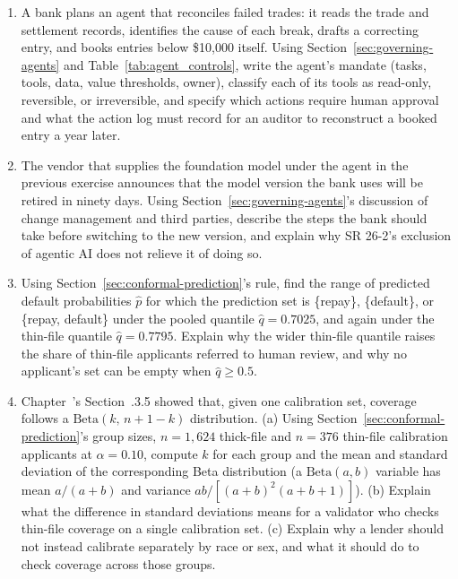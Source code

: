 \documentclass[../ai_in_finance]{subfiles}
\begin{document}
\begin{enumerate}[exercises]
    \item A bank plans an agent that reconciles failed trades: it reads the trade and settlement records, identifies the cause of each break, drafts a correcting entry, and books entries below \$10{,}000 itself. Using Section~\ref{sec:governing-agents} and Table~\ref{tab:agent_controls}, write the agent's mandate (tasks, tools, data, value thresholds, owner), classify each of its tools as read-only, reversible, or irreversible, and specify which actions require human approval and what the action log must record for an auditor to reconstruct a booked entry a year later.
    \item The vendor that supplies the foundation model under the agent in the previous exercise announces that the model version the bank uses will be retired in ninety days. Using Section~\ref{sec:governing-agents}'s discussion of change management and third parties, describe the steps the bank should take before switching to the new version, and explain why SR 26-2's exclusion of agentic AI does not relieve it of doing so.
    \item Using Section~\ref{sec:conformal-prediction}'s rule, find the range of predicted default probabilities $\hat p$ for which the prediction set is \{repay\}, \{default\}, or \{repay, default\} under the pooled quantile $\hat q = 0.7025$, and again under the thin-file quantile $\hat q = 0.7795$. Explain why the wider thin-file quantile raises the share of thin-file applicants referred to human review, and why no applicant's set can be empty when $\hat q \ge 0.5$.
    \item Chapter~'s Section~.3.5 showed that, given one calibration set, coverage follows a $\text{Beta}(k,\, n+1-k)$ distribution. (a) Using Section~\ref{sec:conformal-prediction}'s group sizes, $n = 1{,}624$ thick-file and $n = 376$ thin-file calibration applicants at $\alpha = 0.10$, compute $k$ for each group and the mean and standard deviation of the corresponding Beta distribution (a $\text{Beta}(a, b)$ variable has mean $a/(a+b)$ and variance $ab/[(a+b)^2(a+b+1)]$). (b) Explain what the difference in standard deviations means for a validator who checks thin-file coverage on a single calibration set. (c) Explain why a lender should not instead calibrate separately by race or sex, and what it should do to check coverage across those groups.

\end{enumerate}
\end{document}
